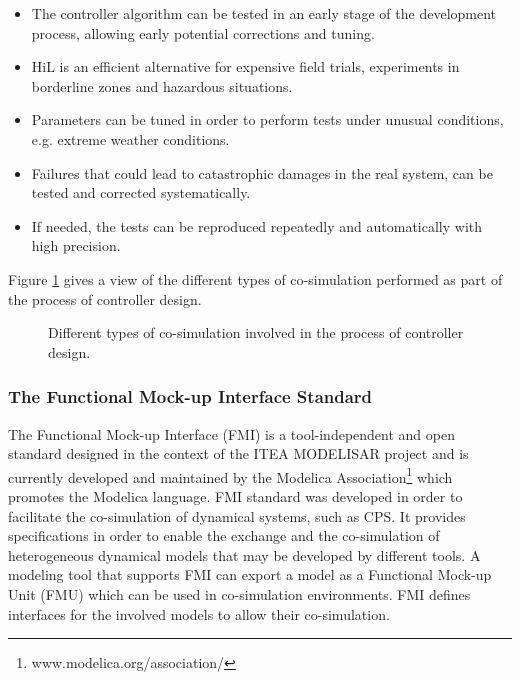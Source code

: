 \begin{itemize}

\item The controller algorithm can be tested in an early stage of the development process, allowing early potential corrections and tuning.

\item HiL is an efficient alternative for expensive field trials, experiments in borderline zones and hazardous situations.

\item Parameters can be tuned in order to perform tests under unusual conditions, e.g. extreme weather conditions. 

\item Failures that could lead to catastrophic damages in the real system, can be tested and corrected systematically.  

\item If needed, the tests can be reproduced repeatedly and automatically with high precision.

\end{itemize}

Figure \ref{fig:mbd} gives a view of the different types of co-simulation performed as part of the process of controller design.

\begin{figure}[phbt]
\centering

\caption{Different types of co-simulation involved in the process of controller design.}
\label{fig:mbd}
\end{figure}


\subsubsection{The Functional Mock-up Interface Standard}

The Functional Mock-up Interface (FMI) is a tool-independent and open standard designed in the context of the ITEA MODELISAR project and is currently developed and maintained by the Modelica Association\footnote{www.modelica.org/association/} which promotes the Modelica language. FMI standard was developed in order to facilitate the co-simulation of dynamical systems, such as CPS. It provides specifications in order to enable the exchange and the co-simulation of heterogeneous dynamical models that may be developed by different tools. A modeling tool that supports FMI can export a model as a Functional Mock-up Unit (FMU) which can be used in co-simulation environments. FMI defines interfaces for the involved models to allow their co-simulation.


